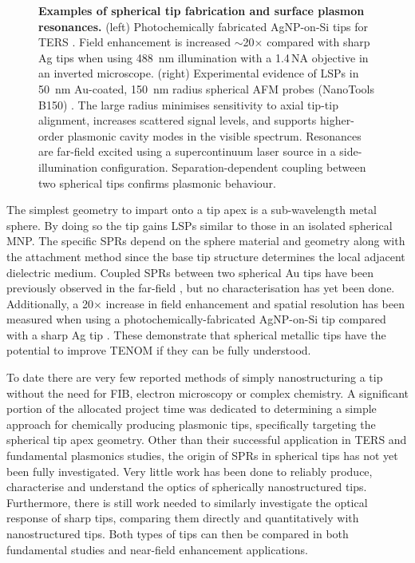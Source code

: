 \documentclass{article}
\begin{document}
\begin{figure}[bt]
\begin{subfigure}[t]{0.6\textwidth}
\end{subfigure}
\caption[Examples of spherical tip fabrication and surface plasmon resonances]{\textbf{Examples of spherical tip fabrication and surface plasmon resonances.} (left) Photochemically fabricated AgNP-on-Si tips for TERS \cite{umakoshi2012}. Field enhancement is increased $\sim$20$\times$ compared with sharp Ag tips when using \SI{488}{nm} illumination with a 1.4\,NA objective in an inverted microscope. (right) Experimental evidence of LSPs in \SI{50}{nm} Au-coated, \SI{150}{nm} radius spherical AFM probes (NanoTools B150) \cite{savage2012}. The large radius minimises sensitivity to axial tip-tip alignment, increases scattered signal levels, and supports higher-order plasmonic cavity modes in the visible spectrum. Resonances are far-field excited using a supercontinuum laser source in a side-illumination configuration. Separation-dependent coupling between two spherical tips confirms plasmonic behaviour.}
\label{fig:savage2012a}
\end{figure}

The simplest geometry to impart onto a tip apex is a sub-wavelength metal sphere. By doing so the tip gains LSPs similar to those in an isolated spherical MNP. The specific SPRs depend on the sphere material and geometry along with the attachment method since the base tip structure determines the local adjacent dielectric medium. Coupled SPRs between two spherical Au tips have been previously observed in the far-field \cite{savage2012}, but no characterisation has yet been done. Additionally, a 20$\times$ increase in field enhancement and spatial resolution has been measured when using a photochemically-fabricated AgNP-on-Si tip compared with a sharp Ag tip \cite{umakoshi2012}. These demonstrate that spherical metallic tips have the potential to improve TENOM if they can be fully understood.

To date there are very few reported methods of simply nanostructuring a tip without the need for FIB, electron microscopy or complex chemistry. A significant portion of the allocated project time was dedicated to determining a simple approach for chemically producing plasmonic tips, specifically targeting the spherical tip apex geometry. Other than their successful application in TERS and fundamental plasmonics studies, the origin of SPRs in spherical tips has not yet been fully investigated. Very little work has been done to reliably produce, characterise and understand the optics of spherically nanostructured tips. Furthermore, there is still work needed to similarly investigate the optical response of sharp tips, comparing them directly and quantitatively with nanostructured tips. Both types of tips can then be compared in both fundamental studies and near-field enhancement applications.
\end{document}
